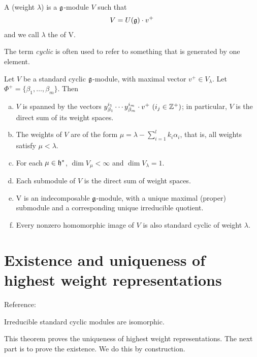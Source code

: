 A  (weight $\lambda$) is a $\mathfrak{g}$-module $V$ such that 
\begin{align*}
    V=U(\mathfrak{g})\cdot v^+
\end{align*}
and we call $\lambda$ the  of V. 
\begin{insight}
    The term \emph{cyclic} is often used to refer to something that is generated by one element.
\end{insight}

\begin{theorem} 
    Let $V$ be a standard cyclic $\mathfrak{g}$-module, with maximal vector $v^+\in V_\lambda$. Let $\Phi^+=\{\beta_1,\dotsc,\beta_m\}$. Then
    \begin{enumerate}[(a)]
        \makethislistcompact
        \item $V$ is spanned by the vectors $y_{\beta_1}^{i_1}\cdots y_{\beta_m}^{i_m}\cdot v^+\ (i_j\in \ZZ^+)$; in particular, $V$ is the direct sum of its weight spaces.
        \item  The weights of $V$ are of the form $\mu = \lambda - \sum_{i=1}^{l}k_i \alpha_i$,  that is, all weights satisfy $\mu < \lambda$.
        \item For each $\mu \in \mathfrak{h}^*$, $\dim V_\mu < \infty$ and $\dim V_\lambda = 1$.
        \item Each submodule of $V$ is the direct sum of weight spaces.
        \item V is an indecomposable $\mathfrak{g}$-module, with a unique maximal (proper) submodule and a corresponding unique irreducible quotient.
        \item Every nonzero homomorphic image of $V$ is also standard cyclic of weight $\lambda$.
    \end{enumerate}
\end{theorem}

\section{Existence and uniqueness of highest weight representations}
\label{sec:existence_and_uniqueness_of_highest_weight_representations}
Reference: \cite[$\S 20.3$]{humphreys1972introduction}

\begin{theorem}
    Irreducible standard cyclic modules are isomorphic.
\end{theorem}
This theorem proves the uniqueness of highest weight representations. The next part is to prove the existence. We do this by construction.

